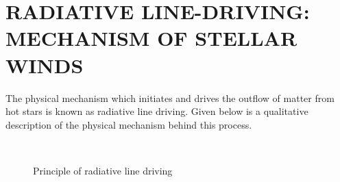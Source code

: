 	\section{\MakeUppercase{Radiative Line-Driving: Mechanism of Stellar Winds}} \label{tool:radiative-line-driving}
		The physical mechanism which initiates and drives the outflow of matter from hot stars is known as radiative line driving. Given below is a qualitative description of the physical mechanism behind this process.
		\begin{figure}[h!]
			\centering
			 \hfill
			 \hfill
			\\ %
			\caption{Principle of radiative line driving}
			\label{rad-line-drive-principle}
		\end{figure}
		
